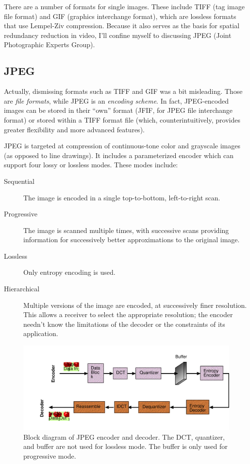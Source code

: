 There are a number of formats for single images. These include TIFF
(tag image file format) and GIF (graphics interchange format), which
are lossless formats that use Lempel-Ziv compression. Because it also
serves as the basis for spatial redundancy reduction in video, I'll
confine myself to discussing JPEG (Joint Photographic Experts Group).

\subsection{JPEG}

Actually, dismissing formats such as
TIFF and GIF was a bit misleading. Those are \emph{file formats}, while JPEG is an
\emph{encoding scheme}. In fact, JPEG-encoded images can be stored in
their ``own'' format (JFIF, for JPEG file interchange format) or
stored within a TIFF format file (which, counterintuitively, provides
greater flexibility and more advanced features).

JPEG is targeted at compression of continuous-tone color and grayscale
images (as opposed to line drawings). It includes a parameterized
encoder which can support four lossy or lossless modes. These modes
include:
\begin{description}
\item[Sequential] The image is encoded in a single top-to-bottom,
left-to-right scan.
\item[Progressive] The image is scanned multiple times, with
successive scans providing information for successively better
approximations to the original image.
\item[Lossless] Only entropy encoding is used.
\item[Hierarchical] Multiple versions of the image are encoded, at
successively finer resolution. This allows a receiver to select the
appropriate resolution; the encoder needn't know the limitations of
the decoder or the constraints of its application.
\end{description}

\begin{figure}
\centerline{\includegraphics[width=\textwidth]{ch-av/fig9-1}}
\caption[Block diagram of JPEG encoder and decoder]{Block diagram of
JPEG encoder and decoder. The DCT, quantizer, and buffer are not used
for lossless mode. The buffer is only used for progressive
mode.\label{fg:jpeg}}
\end{figure}

